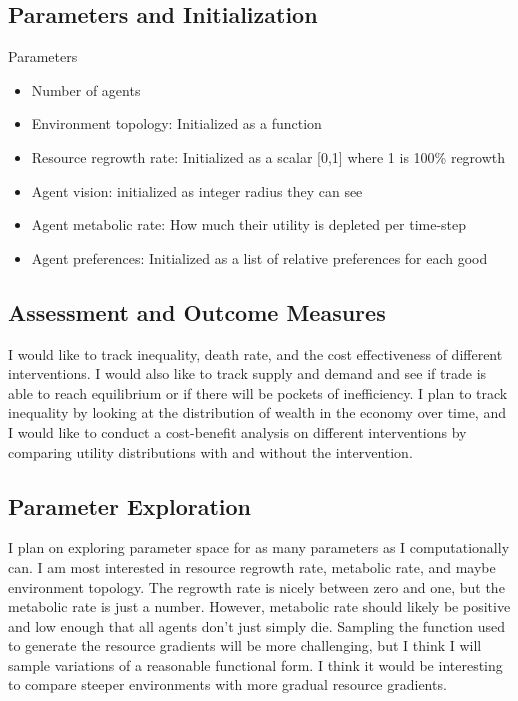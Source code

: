 \documentclass{article}
\begin{document}
\subsection{Parameters and Initialization}
Parameters
\begin{itemize}
    \item Number of agents
    \item Environment topology: Initialized as a function
    \item Resource regrowth rate: Initialized as a scalar [0,1] where 1 is 100\% regrowth
    \item Agent vision: initialized as integer radius they can see
    \item Agent metabolic rate: How much their utility is depleted per time-step
    \item Agent preferences: Initialized as a list of relative preferences for each good
\end{itemize}

\subsection{Assessment and Outcome Measures}
I would like to track inequality, death rate, and the cost effectiveness of different interventions. I would also like to track supply and demand and see if trade is able to reach equilibrium or if there will be pockets of inefficiency. I plan to track inequality by looking at the distribution of wealth in the economy over time, and I would like to conduct a cost-benefit analysis on different interventions by comparing utility distributions with and without the intervention. 

\subsection{Parameter Exploration}
I plan on exploring parameter space for as many parameters as I computationally can. I am most interested in resource regrowth rate, metabolic rate, and maybe environment topology. The regrowth rate is nicely between zero and one, but the metabolic rate is just a number. However, metabolic rate should likely be positive and low enough that all agents don't just simply die. Sampling the function used to generate the resource gradients will be more challenging, but I think I will sample variations of a reasonable functional form. I think it would be interesting to compare steeper environments with more gradual resource gradients.
\end{document}

